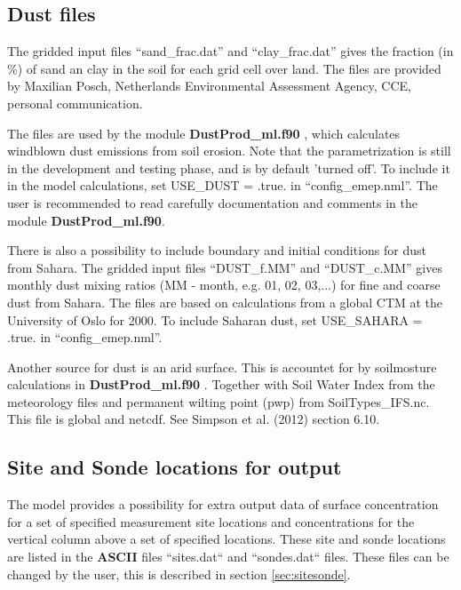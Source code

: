 \subsection{Dust files}

The gridded input files ``sand\_frac.dat'' and ``clay\_frac.dat'' gives the fraction (in \%)  
of sand an clay in the soil for each grid cell over land. The files are provided by 
Maxilian Posch, Netherlands Environmental Assessment Agency, CCE, personal communication.

The files are used by the module {\bf DustProd\_ml.f90 }, which calculates windblown dust 
emissions from soil erosion. Note that the parametrization is still in the development and 
testing phase, and is by default 'turned off'. To include it in the model calculations, set 
USE\_DUST = .true. in ``config\_emep.nml''.
The user is recommended to read carefully documentation and
comments in the module {\bf DustProd\_ml.f90}.

There is also a possibility to include boundary and initial conditions for dust from Sahara. 
The gridded input files ``DUST\_f.MM'' and ``DUST\_c.MM'' gives monthly dust mixing 
ratios (MM - month, e.g. 01, 02, 03,...) for fine and coarse dust from Sahara. The files are based on calculations 
from a global CTM at the University of Oslo for 2000. 
To include Saharan dust, set USE\_SAHARA = .true. in ``config\_emep.nml''.

Another source for dust is an arid surface. This is accountet for by soilmosture calculations in {\bf DustProd\_ml.f90 }. 
Together with Soil Water Index from the meteorology files and permanent wilting point (pwp) from SoilTypes\_IFS.nc. 
This file is global and netcdf. See Simpson et al. (2012) section 6.10.



\subsection{Site and Sonde locations for output}\label{sec:sitessondes_input}
The model provides a possibility for extra output data of surface concentration 
for a set of specified measurement site locations and concentrations for the vertical 
column above a set of specified locations. These site and sonde locations are listed 
in the {\bf ASCII} files ``sites.dat`` and ``sondes.dat`` files. These files can be 
changed by the user, this is described in section \ref{sec:sitesonde}.

